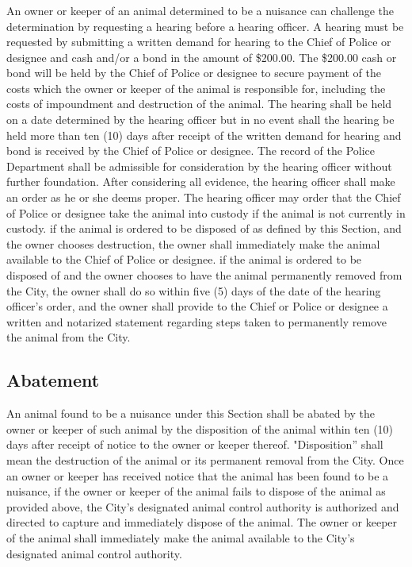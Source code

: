 \subsubsection{}
An owner or keeper of an animal determined to be a nuisance can challenge the determination by requesting a hearing before a hearing officer. A hearing must be requested by submitting a written demand for hearing to the Chief of Police or designee and cash and/or a bond in the amount of \$200.00. The \$200.00 cash or bond will be held by the Chief of Police or designee to secure payment of the costs which the owner or keeper of the animal is responsible for, including the costs of impoundment and destruction of the animal. The hearing shall be held on a date determined by the hearing officer but in no event shall the hearing be held more than ten (10) days after receipt of the written demand for hearing and bond is received by the Chief of Police or designee. The record of the Police Department shall be admissible for consideration by the hearing officer without further foundation. After considering all evidence, the hearing officer shall make an order as he or she deems proper. The hearing officer may order that the Chief of Police or designee take the animal into custody if the animal is not currently in custody. if the animal is ordered to be disposed of as defined by this Section, and the owner chooses destruction, the owner shall immediately make the animal available to the Chief of Police or designee. if the animal is ordered to be disposed of and the owner chooses to have the animal permanently removed from the City, the owner shall do so within five (5) days of the date of the hearing officer's order, and the owner shall provide to the Chief or Police or designee a written and notarized statement regarding steps taken to permanently remove the animal from the City.
\subsection{Abatement}
An animal found to be a nuisance under this Section shall be abated by the owner or keeper of such animal by the disposition of the animal within ten (10) days after receipt of notice to the owner or keeper thereof. "Disposition” shall mean the destruction of the animal or its permanent removal from the City. Once an owner or keeper has received notice that the animal has been found to be a nuisance, if the owner or keeper of the animal fails to dispose of the animal as provided above, the City’s designated animal control authority is authorized and directed to capture and immediately dispose of the animal. The owner or keeper of the animal shall immediately make the animal available to the City’s designated animal control authority.
